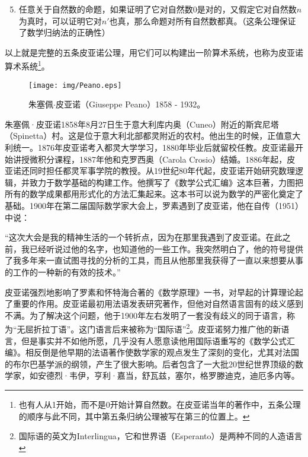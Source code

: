 \documentclass[UTF8]{article}
\begin{document}
\begin{enumerate}
  \setcounter{enumi}{4}
  \item 任意关于自然数的命题，如果证明了它对自然数0是对的，又假定它对自然数$n$为真时，可以证明它对$n'$也真，那么命题对所有自然数都真。（这条公理保证了数学归纳法的正确性）
\end{enumerate}

以上就是完整的五条皮亚诺公理，用它们可以构建出一阶算术系统，也称为皮亚诺算术系统\footnote{也有人从1开始，而不是0开始计算自然数。在皮亚诺当年的著作中，五条公理的顺序与此不同，其中第五条归纳公理被写在第三的位置上。}。

\begin{wrapfigure}{R}{0.35\textwidth}
 \centering
 \texttt{[image: img/Peano.eps]}
 \captionsetup{labelformat=empty}
 \caption{朱塞佩$\cdot$皮亚诺（Giuseppe Peano）1858 - 1932。}
 \label{fig:Peano}
\end{wrapfigure}

朱塞佩·皮亚诺1858年8月27日生于意大利库内奥（Cuneo）附近的斯宾尼塔（Spinetta）村。这是位于意大利北部都灵附近的农村。他出生的时候，正值意大利统一。1876年皮亚诺考入都灵大学学习，1880年毕业后就留校任教。皮亚诺最开始讲授微积分课程，1887年他和克罗西奥（Carola Crosio）结婚。1886年起，皮亚诺还同时担任都灵军事学院的教授。从19世纪80年代起，皮亚诺开始研究数理逻辑，并致力于数学基础的构建工作。他撰写了《数学公式汇编》这本巨著，力图把所有的数学成果都用形式化的方法汇集起来。这本书可以说为数学的严密化奠定了基础。1900年在第二届国际数学家大会上，罗素遇到了皮亚诺，他在自传（1951）中说\cite{M-Kline-2007}：

“这次大会是我的精神生活的一个转折点，因为在那里我遇到了皮亚诺。在此之前，我已经听说过他的名字，也知道他的一些工作。我突然明白了，他的符号提供了我多年来一直试图寻找的分析的工具，而且从他那里我获得了一直以来想要从事的工作的一种新的有效的技术。”

皮亚诺强烈地影响了罗素和怀特海合著的《数学原理》一书，对早起的计算理论起了重要的作用。皮亚诺最初用法语发表研究著作，但他对自然语言固有的歧义感到不满。为了解决这个问题，他于1900年左右发明了一套没有歧义的同于语言，称为“无屈折拉丁语”。这门语言后来被称为“国际语”\footnote{国际语的英文为Interlingua，它和世界语（Esperanto）是两种不同的人造语言}。皮亚诺努力推广他的新语言，但是事实并不如他所愿，几乎没有人愿意读他用国际语重写的《数学公式汇编》。相反倒是他早期的法语著作使数学家的观点发生了深刻的变化，尤其对法国的布尔巴基学派的纲领，产生了很大影响。后者包含了一大批20世纪世界顶级的数学家，如安德烈·韦伊，亨利·嘉当，舒瓦兹，塞尔，格罗滕迪克，迪厄多内等。
\end{document}
